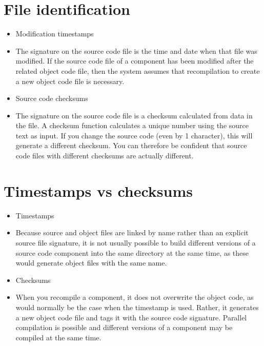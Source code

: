 \section{File identification}
\begin{itemize}
\item Modification timestamps

   \item The signature on the source code file is the time and date when that file was modified. If the source code file of a component has been modified after the related object code file, then the system assumes that recompilation to create a new object code file is necessary.

\item Source code checksums

   \item The signature on the source code file is a checksum calculated from data in the file. A checksum function calculates a unique number using the source text as input. If you change the source code (even by 1 character), this will generate a different checksum. You can therefore be confident that source code files with different checksums are actually different.

\end{itemize}
\section{Timestamps vs checksums}
\begin{itemize}

\item Timestamps

   \item Because source and object files are linked by name rather than an explicit source file signature, it is not usually possible to build different versions of a source code component into the same directory at the same time, as these would generate object files with the same name.

\item Checksums

   \item When you recompile a component, it does not overwrite the object code, as would normally be the case when the timestamp is used. Rather, it generates a new object code file and tags it with the source code signature. Parallel compilation is possible and different versions of a component may be compiled at the same time.
\end{itemize}
